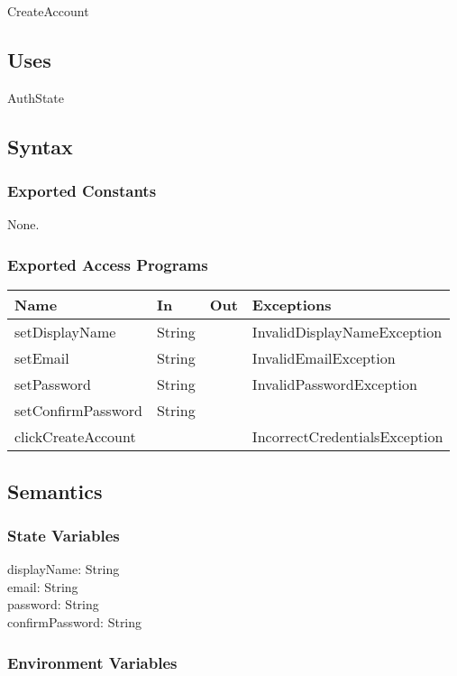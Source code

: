 \documentclass[12pt, titlepage]{article}
\begin{document}
CreateAccount

\subsection{Uses}

AuthState

\subsection{Syntax}

\subsubsection{Exported Constants}
None.
\subsubsection{Exported Access Programs}

\begin{center}
\begin{tabular}{p{4cm} p{2cm} p{2cm} p{6cm}}
\hline
\textbf{Name} & \textbf{In} & \textbf{Out} & \textbf{Exceptions} \\
\hline
setDisplayName & String &  & InvalidDisplayNameException \\ \hline
setEmail & String &  & InvalidEmailException \\ \hline
setPassword & String &  & InvalidPasswordException \\ \hline
setConfirmPassword & String & \\ \hline
clickCreateAccount &  &  & IncorrectCredentialsException \\
\hline
\end{tabular}
\end{center}

\subsection{Semantics}

\subsubsection{State Variables}
displayName: String \\ 
email: String \\ 
password: String  \\ 
confirmPassword: String  \\

\subsubsection{Environment Variables}
\end{document}
